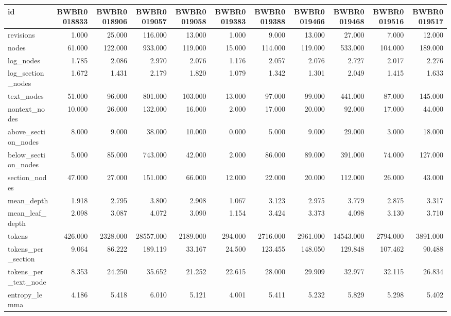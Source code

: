 \begin{tabular}{lrrrrrrrrrr}
\toprule
id & BWBR0018833 & BWBR0018906 & BWBR0019057 & BWBR0019058 & BWBR0019383 & BWBR0019388 & BWBR0019466 & BWBR0019468 & BWBR0019516 & BWBR0019517 \\
\midrule
revisions & 1.000 & 25.000 & 116.000 & 13.000 & 1.000 & 9.000 & 13.000 & 27.000 & 7.000 & 12.000 \\
\cline{1-11}
nodes & 61.000 & 122.000 & 933.000 & 119.000 & 15.000 & 114.000 & 119.000 & 533.000 & 104.000 & 189.000 \\
\cline{1-11}
log\_nodes & 1.785 & 2.086 & 2.970 & 2.076 & 1.176 & 2.057 & 2.076 & 2.727 & 2.017 & 2.276 \\
\cline{1-11}
log\_section\_nodes & 1.672 & 1.431 & 2.179 & 1.820 & 1.079 & 1.342 & 1.301 & 2.049 & 1.415 & 1.633 \\
\cline{1-11}
text\_nodes & 51.000 & 96.000 & 801.000 & 103.000 & 13.000 & 97.000 & 99.000 & 441.000 & 87.000 & 145.000 \\
\cline{1-11}
nontext\_nodes & 10.000 & 26.000 & 132.000 & 16.000 & 2.000 & 17.000 & 20.000 & 92.000 & 17.000 & 44.000 \\
\cline{1-11}
above\_section\_nodes & 8.000 & 9.000 & 38.000 & 10.000 & 0.000 & 5.000 & 9.000 & 29.000 & 3.000 & 18.000 \\
\cline{1-11}
below\_section\_nodes & 5.000 & 85.000 & 743.000 & 42.000 & 2.000 & 86.000 & 89.000 & 391.000 & 74.000 & 127.000 \\
\cline{1-11}
section\_nodes & 47.000 & 27.000 & 151.000 & 66.000 & 12.000 & 22.000 & 20.000 & 112.000 & 26.000 & 43.000 \\
\cline{1-11}
mean\_depth & 1.918 & 2.795 & 3.800 & 2.908 & 1.067 & 3.123 & 2.975 & 3.779 & 2.875 & 3.317 \\
\cline{1-11}
mean\_leaf\_depth & 2.098 & 3.087 & 4.072 & 3.090 & 1.154 & 3.424 & 3.373 & 4.098 & 3.130 & 3.710 \\
\cline{1-11}
tokens & 426.000 & 2328.000 & 28557.000 & 2189.000 & 294.000 & 2716.000 & 2961.000 & 14543.000 & 2794.000 & 3891.000 \\
\cline{1-11}
tokens\_per\_section & 9.064 & 86.222 & 189.119 & 33.167 & 24.500 & 123.455 & 148.050 & 129.848 & 107.462 & 90.488 \\
\cline{1-11}
tokens\_per\_text\_node & 8.353 & 24.250 & 35.652 & 21.252 & 22.615 & 28.000 & 29.909 & 32.977 & 32.115 & 26.834 \\
\cline{1-11}
entropy\_lemma & 4.186 & 5.418 & 6.010 & 5.121 & 4.001 & 5.411 & 5.232 & 5.829 & 5.298 & 5.402 \\

\end{tabular}
